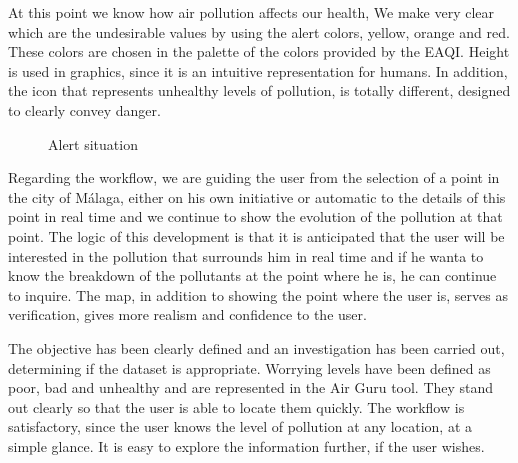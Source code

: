 At this point we know how air pollution affects our health, We make very clear which are the undesirable values by using the alert colors, yellow, orange and 
red. These colors are chosen in the palette of the colors provided by the EAQI.
Height is used in graphics, since it is an intuitive representation for humans. In addition, the icon that represents unhealthy levels of pollution, is
totally different, designed to clearly convey danger. \\
\begin{figure}[ht]
    \centering
    \hfill
  
  \caption{Alert situation}
    \end{figure}

    Regarding the workflow, we are guiding the user from the selection of a point in the city of Málaga, either on his own initiative
    or automatic to the details of this point in real time and we continue to show  the evolution of the pollution at that point.
    The logic of this development is that it is anticipated that the user will be interested in the pollution that surrounds him in real time and if
    he wanta to know the breakdown of the pollutants at the point where he is, he can continue to inquire. The map, in addition to showing
    the point where the user is, serves as verification, gives more realism and confidence to the user.

\begin{itemize}
    \done The objective has been clearly defined and an investigation has been carried out, determining if the dataset is appropriate.
    \done Worrying levels have been defined as poor, bad and unhealthy and are represented in the Air Guru tool. They stand out clearly so that the user is able to locate them quickly.
     \done The workflow is satisfactory, since the user knows the level of pollution at any location, at a simple glance. It is easy to explore the information further, if the user wishes.
         
\end{itemize}